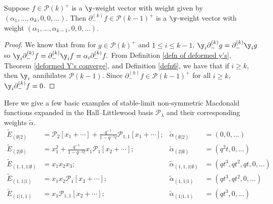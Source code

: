 \begin{lemm} \label{weight vectors and lowering}
Suppose $f \in \mathcal{P}(k)^{+}$ is a $\y$-weight vector with weight given by $(\alpha_1,\ldots,\alpha_k,0,0,\ldots)$. Then $\partial_{-}^{(k)} f \in \mathcal{P}(k-1)^{+}$ is a $\y$-weight vector with weight $(\alpha_1,\ldots,\alpha_{k-1},0,0,\ldots)$. 
\end{lemm}

\begin{proof}
We know that from \cite[Section 7, Thm. 7.13, page 36]{Ion_2022} for $g \in \mathcal{P}(k)^{+}$ and $1\leq i \leq k-1$, $\y_i \partial_{-}^{(k)} g = \partial_{-}^{(k)}\y_i g$ so $\y_i\partial_{-}^{(k)} f = \partial_{-}^{(k)}\y_i f = \alpha_i \partial_{-}^{(k)} f.$
From Definition \ref{defn of deformed y's}, Theorem \ref{deformed Y's converge}, and Definition \ref{defn6}, we have that if $i\geq k$, then $\y_i$ annihilates $\mathscr{P}(k-1)$.
Since $\partial_{-}^{(k)}f \in \mathcal{P}(k-1)^{+}$ for all $i \geq k$, $\y_i \partial_{-}^{(k)}f = 0$.
\end{proof}

\begin{exam}
Here we give a few basic examples of stable-limit non-symmetric Macdonald functions expanded in the Hall--Littlewood basis $\mathcal{P}_{\lambda}$ and their corresponding weights $\widetilde\alpha$.
\begin{align*}
      \widetilde{E}_{(\emptyset|2)} &= \mathcal{P}_{2}[x_1+ \cdots] +\frac{q^{-1}}{1-q^{-1}t}\mathcal{P}_{1,1}[x_1+ \cdots]; & %
    \widetilde{\alpha}_{(\emptyset|2)} &= (0,0,\ldots) \\
     \widetilde{E}_{(2|\emptyset)} &= x_1^2 + \frac{q^{-1}}{1-q^{-1}t}x_1 \mathcal{P}_1[x_2+ \cdots]; & %
    \widetilde{\alpha}_{(2|\emptyset)} &= (q^2t,0,\ldots) \\
     \widetilde{E}_{(1,1,1|\emptyset)} &= x_1x_2x_3; & %
    \widetilde{\alpha}_{(1,1,1|\emptyset)} &=(qt^3,qt^2,qt,0,\ldots) \\
     \widetilde{E}_{(1,1|1)} &= x_1x_2\mathcal{P}_1[x_3+ \cdots]; & %
    \widetilde{\alpha}_{(1,1|1)} &= (qt^3,qt^2,0,\ldots) \\
     \widetilde{E}_{(1|1,1)} &= x_1\mathcal{P}_{1,1}[x_2+\cdots]; & %
    \widetilde{\alpha}_{(1|1,1)} &= (qt^3,0,\ldots)
\end{align*}
\end{exam}

